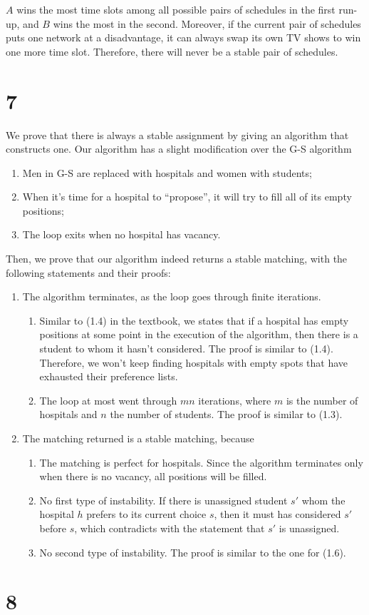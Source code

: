 \documentclass{article}
\begin{document}
$A$ wins the most time slots among all possible pairs of schedules in the first run-up, and $B$ wins the most in the second. Moreover, if the current pair of schedules puts one network at a disadvantage, it can always swap its own TV shows to win one more time slot. Therefore, there will never be a stable pair of schedules.

\section*{7}

We prove that there is always a stable assignment by giving an algorithm that constructs one. Our algorithm has a slight modification over the G-S algorithm

\begin{enumerate}
    \item Men in G-S are replaced with hospitals and women with students;
    \item When it's time for a hospital to ``propose'', it will try to fill all of its empty positions;
    \item The loop exits when no hospital has vacancy.
\end{enumerate}


Then, we prove that our algorithm indeed returns a stable matching, with the following statements and their proofs:

\begin{enumerate}
    \item The algorithm terminates, as the loop goes through finite iterations.
    \begin{enumerate}
        \item Similar to (1.4) in the textbook, we states that if a hospital has empty positions at some point in the execution of the algorithm, then there is a student to whom it hasn't considered. The proof is similar to (1.4). Therefore, we won't keep finding hospitals with empty spots that have exhausted their preference lists.
        \item The loop at most went through $mn$ iterations, where $m$ is the number of hospitals and $n$ the number of students. The proof is similar to (1.3).
    \end{enumerate}
    \item The matching returned is a stable matching, because
    \begin{enumerate}
        \item The matching is perfect for hospitals. Since the algorithm terminates only when there is no vacancy, all positions will be filled.
        \item No first type of instability. If there is unassigned student $s'$ whom the hospital $h$ prefers to its current choice $s$, then it must has considered $s'$ before $s$, which contradicts with the statement that $s'$ is unassigned.
        \item No second type of instability. The proof is similar to the one for (1.6).
    \end{enumerate}
\end{enumerate}

\section*{8}
\end{document}
